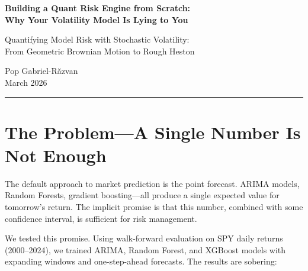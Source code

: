 \documentclass[11pt,a4paper]{article}
\begin{document}
\begin{center}
    {\LARGE\bfseries\color{accentblue} Building a Quant Risk Engine from Scratch:\\[4pt]
    Why Your Volatility Model Is Lying to You}

    \vspace{0.6em}
    {\large Quantifying Model Risk with Stochastic Volatility:\\
    From Geometric Brownian Motion to Rough Heston}

    \vspace{1em}
    {\large Pop Gabriel-R\u{a}zvan}\\[4pt]
    {\normalsize March 2026}
\end{center}

\vspace{0.5em}

\begin{abstract}
\noindent
We present the first phase of a high-performance risk engine that quantifies model risk across a hierarchy of stochastic volatility models. Using a C++20 Monte Carlo framework with OpenMP parallelization, we demonstrate that the choice of volatility model---from classical GBM to Heston to Rough Heston---produces Expected Shortfall estimates that differ by up to 30\%. This model risk is comparable in magnitude to the market risk itself, yet is invisible to practitioners using a single deterministic model.
\end{abstract}

\vspace{0.3em}
\hrule
\vspace{1em}

\section{The Problem---A Single Number Is Not Enough}

The default approach to market prediction is the point forecast. ARIMA models, Random Forests, gradient boosting---all produce a single expected value for tomorrow's return. The implicit promise is that this number, combined with some confidence interval, is sufficient for risk management.

We tested this promise. Using walk-forward evaluation on SPY daily returns (2000--2024), we trained ARIMA, Random Forest, and XGBoost models with expanding windows and one-step-ahead forecasts. The results are sobering:
\end{document}
